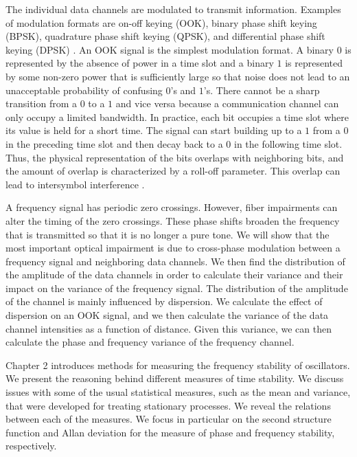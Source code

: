 The individual data channels are modulated to transmit information.  Examples of modulation formats are on-off keying (OOK), binary phase shift keying (BPSK), quadrature phase shift keying (QPSK), and differential phase shift keying (DPSK) \cite{agrawal2012fiber}.  An OOK signal is the simplest modulation format. A binary $0$ is represented by the absence of power in a time slot and a binary $1$ is represented by some non-zero power that is sufficiently large so that noise does not lead to an unacceptable probability of confusing $0$'s and $1$'s.  There cannot be a sharp transition from a $0$ to a $1$ and vice versa because a communication channel can only occupy a limited bandwidth.  In practice, each bit occupies a time slot where its value is held for a short time.  The signal can start building up to a $1$ from a $0$ in the preceding time slot and then decay back to a $0$ in the following time slot. Thus, the physical representation of the bits overlaps with neighboring bits, and the amount of overlap is characterized by a roll-off parameter.  This overlap can lead to intersymbol interference \cite{proakis2001digital}.

A frequency signal has periodic zero crossings.  However, fiber impairments can alter the timing of the zero crossings.  These phase shifts broaden the frequency that is transmitted so that it is no longer a pure tone. We will show that the most important optical impairment is due to cross-phase modulation between a frequency signal and neighboring data channels. We then find the distribution of the amplitude of the data channels in order to calculate their variance and their impact on the variance of the frequency signal.  The distribution of the amplitude of the channel is mainly influenced by dispersion.  We calculate the effect of dispersion on an OOK signal, and we then calculate the variance of the data channel intensities as a function of distance. Given this variance, we can then calculate the phase and frequency variance of the frequency channel.


Chapter 2 introduces methods for measuring the frequency stability of oscillators. We present the reasoning behind different measures of time stability. We discuss issues with some of the usual statistical measures, such as the mean and  variance, that were developed for treating stationary processes. We reveal the relations between each of the measures. We focus in particular on the second structure function and Allan deviation for the measure of phase and frequency stability, respectively.

